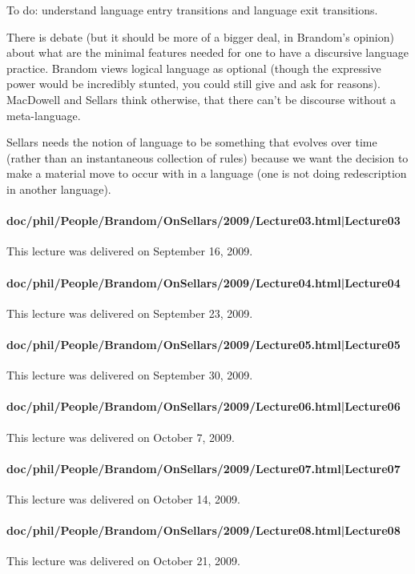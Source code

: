 \documentclass[12pt,a4paper]{report}
\begin{document}
To do: understand language entry transitions and language exit transitions.

There is debate (but it should be more of a bigger deal, in Brandom's opinion) about what are the minimal features needed for one to have a discursive language practice. Brandom views logical language as optional (though the expressive power would be incredibly stunted, you could still give and ask for reasons). MacDowell and Sellars think otherwise, that there can't be discourse without a meta-language.

Sellars needs the notion of language to be something that evolves over time (rather than an instantaneous collection of rules) because we want the decision to make a material move to occur with in a language (one is not doing redescription in another language).
\paragraph{doc/phil/People/Brandom/OnSellars/2009/Lecture03.html|Lecture03}
This lecture was delivered on September 16, 2009.

\paragraph{doc/phil/People/Brandom/OnSellars/2009/Lecture04.html|Lecture04}
This lecture was delivered on September 23, 2009.

\paragraph{doc/phil/People/Brandom/OnSellars/2009/Lecture05.html|Lecture05}
This lecture was delivered on September 30, 2009.

\paragraph{doc/phil/People/Brandom/OnSellars/2009/Lecture06.html|Lecture06}
This lecture was delivered on October 7, 2009.

\paragraph{doc/phil/People/Brandom/OnSellars/2009/Lecture07.html|Lecture07}
This lecture was delivered on October 14, 2009.

\paragraph{doc/phil/People/Brandom/OnSellars/2009/Lecture08.html|Lecture08}
This lecture was delivered on October 21, 2009.
\end{document}
